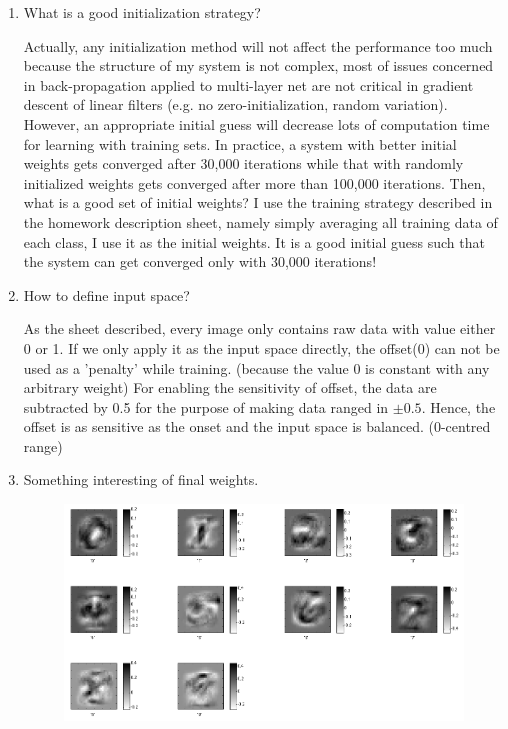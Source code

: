 \documentclass[12pt]{article}
\begin{document}
\begin{enumerate}
	\item What is a good initialization strategy?
	\begin{flushleft}
		Actually, any initialization method will not affect the performance too much because the structure of my system is not complex, most of issues concerned in back-propagation applied to multi-layer net are not critical in gradient descent of linear filters (e.g. no zero-initialization, random variation). However, an appropriate initial guess will decrease lots of computation time for learning with training sets. In practice, a system with better initial weights gets converged after 30,000 iterations while that with randomly initialized weights gets converged after more than 100,000 iterations. Then, what is a good set of initial weights? I use the training strategy described in the homework description sheet, namely simply averaging all training data of each class, I use it as the initial weights. It is a good initial guess such that the system can get converged only with 30,000 iterations!
	\end{flushleft}
	\item How to define input space?
	\begin{flushleft}
		As the sheet described, every image only contains raw data with value either 0 or 1. If we only apply it as the input space directly, the offset(0) can not be used as a 'penalty' while training. (because the value 0 is constant with any arbitrary weight) For enabling the sensitivity of offset, the data are subtracted by 0.5 for the purpose of making data ranged in $\pm 0.5$. Hence, the offset is as sensitive as the onset and the input space is balanced. (0-centred range)
	\end{flushleft}
	\item Something interesting of final weights.
	\begin{figure}[ht]
		\includegraphics[scale=.5]{../res/weights2D.png}

\end{figure}
\end{enumerate}
\end{document}
